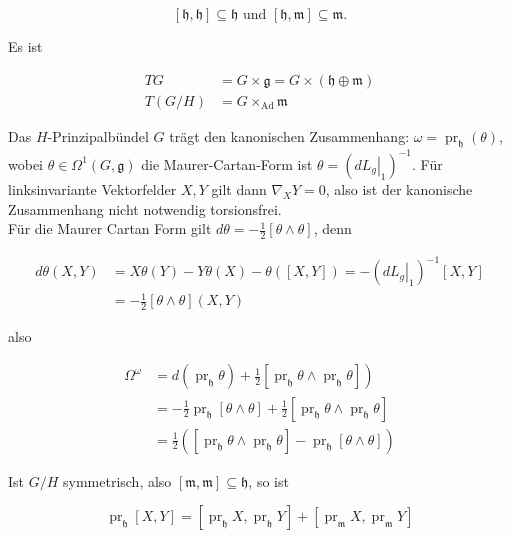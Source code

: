 \documentclass[10pt, letterpaper]{article}
\begin{document}
$$
[\mathfrak{h}, \mathfrak{h}] \subseteq \mathfrak{h} \text { und }[\mathfrak{h}, \mathfrak{m}] \subseteq \mathfrak{m} .
$$

Es ist

$$
\begin{aligned}
T G & =G \times \mathfrak{g}=G \times(\mathfrak{h} \oplus \mathfrak{m}) \\
T(G / H) & =G \times_{\mathrm{Ad}} \mathfrak{m}
\end{aligned}
$$

Das $H$-Prinzipalbündel $G$ trägt den kanonischen Zusammenhang: $\omega=\operatorname{pr}_{\mathfrak{h}}(\theta)$, wobei $\theta \in \Omega^{1}(G, \mathfrak{g})$ die Maurer-Cartan-Form ist $\theta=\left(\left.d L_{g}\right|_{1}\right)^{-1}$. Für linksinvariante Vektorfelder $X, Y$ gilt dann $\nabla_{X} Y=0$, also ist der kanonische Zusammenhang nicht notwendig torsionsfrei.\\
Für die Maurer Cartan Form gilt $d \theta=-\frac{1}{2}[\theta \wedge \theta]$, denn

$$
\begin{aligned}
d \theta(X, Y) & =X \theta(Y)-Y \theta(X)-\theta([X, Y])=-\left(\left.d L_{g}\right|_{1}\right)^{-1}[X, Y] \\
& =-\frac{1}{2}[\theta \wedge \theta](X, Y)
\end{aligned}
$$

also

$$
\begin{aligned}
\Omega^{\omega} & \left.=d\left(\operatorname{pr}_{\mathfrak{h}} \theta\right)+\frac{1}{2}\left[\operatorname{pr}_{\mathfrak{h}} \theta \wedge \operatorname{pr}_{\mathfrak{h}} \theta\right]\right) \\
& =-\frac{1}{2} \operatorname{pr}_{\mathfrak{h}}[\theta \wedge \theta]+\frac{1}{2}\left[\operatorname{pr}_{\mathfrak{h}} \theta \wedge \operatorname{pr}_{\mathfrak{h}} \theta\right] \\
& =\frac{1}{2}\left(\left[\operatorname{pr}_{\mathfrak{h}} \theta \wedge \operatorname{pr}_{\mathfrak{h}} \theta\right]-\operatorname{pr}_{\mathfrak{h}}[\theta \wedge \theta]\right)
\end{aligned}
$$

Ist $G / H$ symmetrisch, also $[\mathfrak{m}, \mathfrak{m}] \subseteq \mathfrak{h}$, so ist

$$
\operatorname{pr}_{\mathfrak{h}}[X, Y]=\left[\operatorname{pr}_{\mathfrak{h}} X, \operatorname{pr}_{\mathfrak{h}} Y\right]+\left[\operatorname{pr}_{\mathfrak{m}} X, \operatorname{pr}_{\mathfrak{m}} Y\right]
$$
\end{document}
